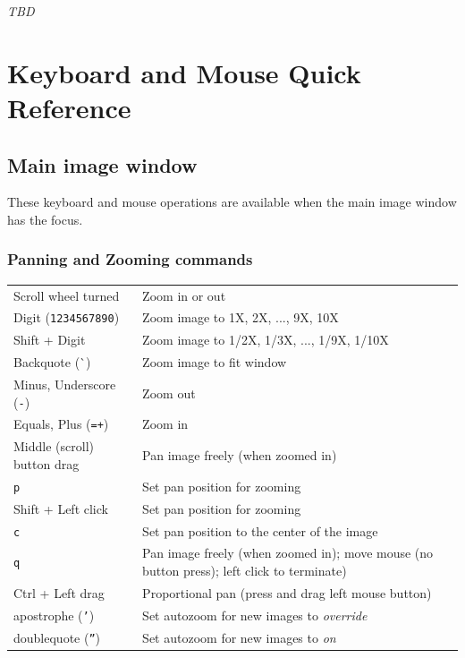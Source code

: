 \documentclass[11pt]{report}
\begin{document}
\emph{TBD}

\appendix    %

\chapter{Keyboard and Mouse Quick Reference}
\label{app:mousekbdref}

\section{Main image window}
These keyboard and mouse operations are available when the main image
window has the focus.

\subsection{Panning and Zooming commands}
\begin{tabularx}{\textwidth}{lX}
Scroll wheel turned & Zoom in or out \\
Digit ({\tt 1234567890}) & Zoom image to 1X, 2X, ..., 9X, 10X \\
Shift + Digit & Zoom image to 1/2X, 1/3X, ..., 1/9X, 1/10X \\
Backquote (\`{}) & Zoom image to fit window \\
Minus, Underscore ({\tt -\textunderscore{}}) & Zoom out \\
Equals, Plus ({\tt =+}) & Zoom in \\
Middle (scroll) button drag & Pan image freely (when zoomed in) \\
{\tt p} & Set pan position for zooming \\
Shift + Left click & Set pan position for zooming \\
{\tt c} & Set pan position to the center of the image \\
{\tt q} & Pan image freely (when zoomed in); move mouse (no button press); left click to terminate) \\
Ctrl + Left drag & Proportional pan (press and drag left mouse button) \\
apostrophe ({\tt '}) & Set autozoom for new images to {\em override} \\
doublequote ({\tt ''}) & Set autozoom for new images to {\em on} \\
\end{tabularx}
\end{document}
